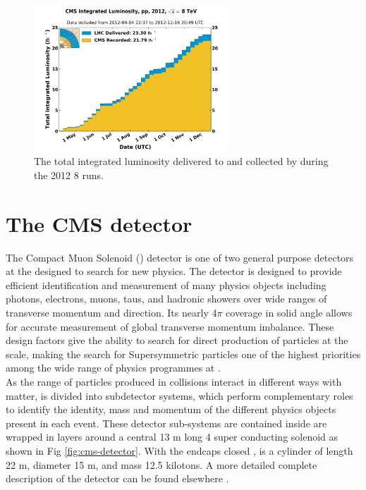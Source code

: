 \begin{figure}[!h]

\centering
\includegraphics[width=0.65\textwidth]{plots/lhc-lumo-8tev.png}
\caption[The total integrated luminosity delivered to and collected by \CMS during the 2012 8 \TeV \pp runs]{The total integrated luminosity delivered to and collected by \CMS during the 2012 8 \TeV \pp runs.}  
\label{fig:lhc-ring}
\end{figure}


\section{The CMS detector}
\label{sec:cmsdetector}

The Compact Muon Solenoid (\CMS) detector is one of two general purpose detectors at the \LHC designed to search for new physics. The detector is designed to provide efficient identification and measurement of many physics objects including photons, electrons, muons, taus, and hadronic showers over wide ranges of transverse momentum and direction. Its nearly 4$\pi$ coverage in solid angle allows for accurate measurement of global transverse momentum imbalance. These design factors give \CMS the ability to search for direct production of \SUSY particles at the \TeV scale, making the search for Supersymmetric particles one of the highest priorities among the wide range of physics programmes at \CMS. \\

As the range of particles produced in \pp collisions interact in different ways with matter, \CMS is divided into subdetector systems, which perform complementary roles to identify the identity, mass and momentum of the different physics objects present in each event. These detector sub-systems are contained inside \CMS are wrapped in layers around a central 13 m long 4 \T super conducting solenoid as shown in Fig \ref{fig:cms-detector}. With the endcaps closed , \CMS is a cylinder of length 22 m, diameter 15 m, and mass 12.5 kilotons. A more detailed complete description of the detector can be found elsewhere \cite{cmstdr}. \\

